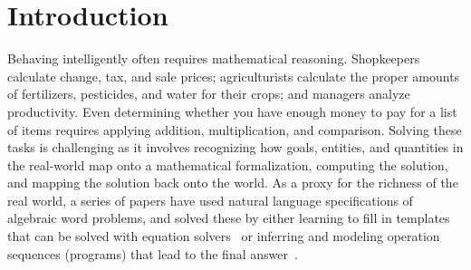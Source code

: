 
\section{Introduction}
Behaving intelligently often requires mathematical reasoning. Shopkeepers calculate change, tax, and sale prices; agriculturists calculate the proper amounts of fertilizers, pesticides, and water for their crops; and managers analyze productivity. Even determining whether you have enough money to pay for a list of items requires applying addition, multiplication, and comparison. Solving these tasks is challenging as it involves recognizing how goals, entities, and quantities in the real-world map onto a mathematical formalization, computing the solution, and mapping the solution back onto the world. As a proxy for the richness of the real world, a series of papers have used natural language specifications of algebraic word problems, and solved these by either learning to fill in templates that can be solved with equation solvers~\cite{DBLP:conf/emnlp/HosseiniHEK14,kushman-EtAl:2014:P14-1} or inferring and modeling operation sequences (programs) that lead to the final answer~\cite{Roy2015SolvingGA}.

